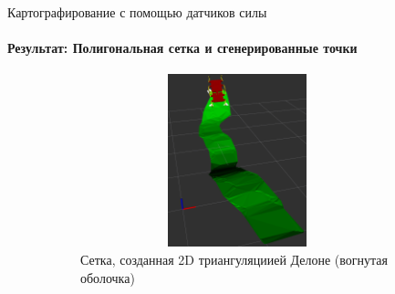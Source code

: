 \documentclass[aspectratio=169,xcolor=table]{beamer}
\begin{document}
\begin{frame}[t]{Картографирование с помощью датчиков силы}
    \framesubtitle{Результат: Полигональная сетка и сгенерированные точки}
    \vspace{-15pt}
    \begin{figure}[H]
        \begin{subfigure}[t]{0.49\textwidth}
            \centering\includegraphics[height=5cm,width=1\textwidth,keepaspectratio]{mesh_rviz.png}
            \caption*{Сетка, созданная 2D триангуляциией Делоне (вогнутая оболочка)}
        \end{subfigure}
        \begin{subfigure}[t]{0.49\textwidth}
                \centering
\end{subfigure}
\end{figure}
\end{frame}
\end{document}
